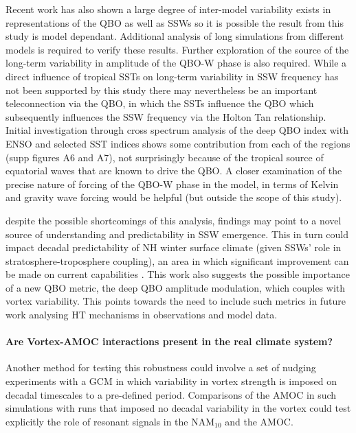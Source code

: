 Recent work has also shown a large degree of inter-model variability exists in representations of the QBO as well as SSWs \citep{bushellEvaluation2020,ayarzaguenaUncertainty2020} so it is possible the result from this study is model dependant. Additional analysis of long simulations from different models is required to verify these results. 
Further exploration of the source of the long-term variability in amplitude of the QBO-W phase is also required. While a direct influence of tropical SSTs on long-term variability in SSW frequency has not been supported by this study there may nevertheless be an important teleconnection via the QBO, in which the SSTs influence the QBO which subsequently influences the SSW frequency via the Holton Tan relationship. Initial investigation through cross spectrum analysis of the deep QBO index with ENSO and selected SST indices shows some contribution from each of the regions (supp figures A6 and A7), not surprisingly because of the tropical source of equatorial waves that are known to drive the QBO. A closer examination of the precise nature of forcing of the QBO-W phase in the model, in terms of Kelvin and gravity wave forcing would be helpful (but outside the scope of this study).

despite the possible shortcomings of this analysis, findings may point to a novel source of understanding and predictability in SSW emergence. This in turn could impact decadal predictability of NH winter surface climate (given SSWs' role in stratosphere-troposphere coupling), an area in which significant improvement can be made on current capabilities \citep{Zhang2019}. This work also suggests the possible importance of a new QBO metric, the deep QBO amplitude modulation, which couples with vortex variability. This points towards the need to include such metrics in future work analysing HT mechanisms in observations and model data.



\paragraph{Are Vortex-AMOC interactions present in the real climate system?} 

Another method for testing this robustness could involve a set of nudging experiments with a GCM in which variability in vortex strength is imposed on decadal timescales to a pre-defined period. Comparisons of the AMOC in such simulations with runs that imposed no decadal variability in the vortex could test explicitly the role of resonant signals in the NAM$_{10}$ and the AMOC. 